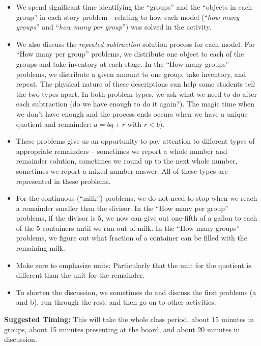 \documentclass{ximera}
\begin{document}
\begin{instructorNotes}
\begin{itemize}
	\item We spend significant time identifying the ``groups'' and the ``objects in each group'' in each story problem - relating to how each model (``{\em how many groups}'' and ``{\em how many per group}'') was solved in the activity.
	\item We also discuss the {\em repeated subtraction} solution process for each model.  For ``How many per group'' problems, we distribute one object to each of the groups and take inventory at each stage.  In the ``How many groups'' problems, we distribute a given amount to one group, take inventory, and repeat.  The physical nature of these descriptions can help some students tell the two types apart.  In both problem types, we ask what we need to do after each subtraction (do we have enough to do it again?). The magic time when we don't have enough and the process ends occurs when we have a unique quotient and remainder:  $a = bq + r$ with $r < b$).  
	\item These problems give us an opportunity to pay attention to different types of appropriate remainders -- sometimes we report a whole number and remainder solution, sometimes we round up to the next whole number, sometimes we report a mixed number answer.  All of these types are represented in these problems. 
	\item For the continuous (``milk'') problems, we do not need to stop when we reach a remainder smaller than the divisor.  In the ``How many per group'' problems, if the divisor is 5, we now can give out one-fifth of a gallon to each of the 5 containers until we run out of milk.  In the ``How many groups'' problems, we figure out what fraction of a container can be filled with the remaining milk.
	\item Make sure to emphasize units:  Particularly that the unit for the quotient is different than the unit for the remainder.
    \item To shorten the discussion, we sometimes do and discuss the first problems (a and b), run through the rest, and then go on to other activities.
\end{itemize}



{\bf Suggested Timing:} This will take the whole class period, about 15 minutes in groups, about 15 minutes presenting at the board, and about 20 minutes in discussion.
\end{instructorNotes}
\end{document}

